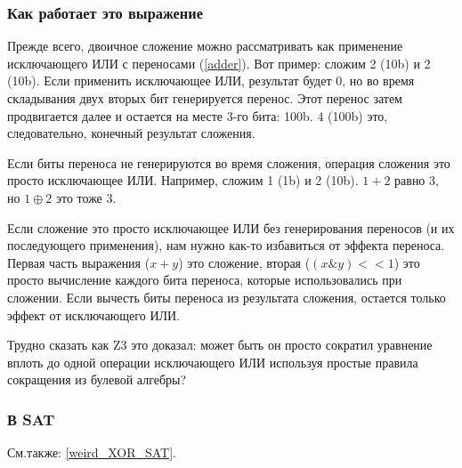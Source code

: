 \subsubsection{Как работает это выражение}

Прежде всего, двоичное сложение можно рассматривать как применение исключающего ИЛИ с переносами (\ref{adder}).
Вот пример: сложим 2 (10b) и 2 (10b).
Если применить исключающее ИЛИ, результат будет 0, но во время складывания двух вторых бит генерируется перенос.
Этот перенос затем продвигается далее и остается на месте 3-го бита: 100b.
4 (100b) это, следовательно, конечный результат сложения.

Если биты переноса не генерируются во время сложения, операция сложения это просто исключающее ИЛИ.
Например, сложим 1 (1b) и 2 (10b). $1 + 2$ равно 3, но $1 \oplus 2$ это тоже 3.

Если сложение это просто исключающее ИЛИ без генерирования переносов (и их последующего применения), нам нужно
как-то избавиться от эффекта переноса.
Первая часть выражения ($x + y$) это сложение, вторая ($(x \& y)<<1$) это просто вычисление каждого бита переноса,
которые использовались при сложении.
Если вычесть биты переноса из результата сложения, остается только эффект от исключающего ИЛИ.

Трудно сказать как Z3 это доказал:
может быть он просто сократил уравнение вплоть до одной операции исключающего ИЛИ используя 
простые правила сокращения из булевой алгебры?

\subsubsection{В SAT}

См.также: \ref{weird_XOR_SAT}.


